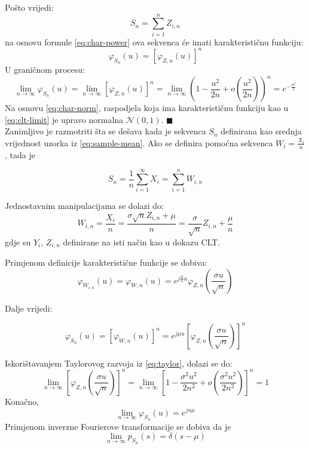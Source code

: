 Pošto vrijedi:
\begin{equation}
  S_n = \sum_{i=1}^{n} Z_{i,n}
\end{equation}
na osnovu formule \eqref{eq:char-power} ova sekvenca će imati karakterističnu
funkciju:
\begin{equation}
  \varphi_{S_n}(u) = \left[\varphi_{Z,n}(u)\right]^n
\end{equation}
U graničnom procesu:
\begin{equation} \label{eq:clt-limit}
  \lim_{n\to\infty} \varphi_{S_n}(u)
  = \lim_{n\to\infty} [\varphi_{Z,n}(u)]^n
  = \lim_{n\to\infty}
    \left(1 - \frac{u^2}{2n} + o\left(\frac{u^2}{2n}\right)\right)^n
    = e^{-\frac{u^2}{2}}
\end{equation}
Na osnovu \eqref{eq:char-norm}, raspodjela koja ima karakterističnu funkciju kao
u \eqref{eq:clt-limit} je upravo normalna $\mathcal{N}(0,1)$. $\blacksquare$ \\

Zanimljivo je razmotriti šta se dešava kada je sekvenca $S_n$ definirana kao
srednja vrijednost uzorka iz \eqref{eq:sample-mean}. Ako se definira pomoćna
sekvenca $W_i = \frac{X_i}{n}$, tada je

\begin{equation}
  S_n = \frac{1}{n}\sum_{i=1}^{\infty} X_i = \sum_{i=1}^{n} W_{i,n}
\end{equation}

Jednostavnim manipulacijama se dolazi do:
\begin{equation}
  W_{i,n} = \frac{X_i}{n} = \frac{\sigma \sqrt{n} Z_{i,n}+\mu}{n}
  = \frac{\sigma}{\sqrt{n}} Z_{i,n} + \frac{\mu}{n}
\end{equation}
gdje su $Y_i$, $Z_{i,n}$ definirane na isti način kao u dokazu CLT.

Primjenom definicije karakteristične funkcije se dobiva:
\begin{equation}
  \varphi_{W_{i,n}}(u) = \varphi_{W,n}(u)
  = e^{j\frac{\mu}{n} u} \varphi_{Z,n}\left(\frac{\sigma u}{\sqrt{n}}\right)
\end{equation}

Dalje vrijedi:

\begin{equation}
  \varphi_{S_n}(u) = [\varphi_{W,n}(u)]^n
  = e^{j\mu u} \left[\varphi_{Z,n}\left(\frac{\sigma u}{\sqrt{n}}\right)\right]^n
\end{equation}

Iskorištavanjem Taylorovog razvoja iz \eqref{eq:taylor}, dolazi se do:
\begin{equation}
  \lim_{n\to\infty}
    \left[\varphi_{Z,n}\left(\frac{\sigma u}{\sqrt{n}}\right)\right]^n
    = \lim_{n\to\infty} \left[1-\frac{\sigma^2u^2}{2n^2} +
      o\left(\frac{\sigma^2u^2}{2n^2}\right)\right]^n
    = 1
\end{equation}
Konačno,
\begin{equation}
  \lim_{n\to\infty} \varphi_{S_n}(u) = e^{ju\mu}
\end{equation}
Primjenom inverzne Fourierove transformacije se dobiva da je
\begin{equation}
  \lim_{n\to\infty} p_{S_n}(s) = \delta(s-\mu)
\end{equation}

